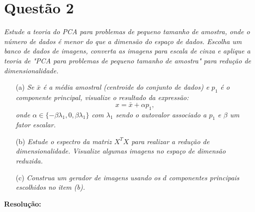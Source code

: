 \documentclass[a4paper, 11pt]{article}
\begin{document}

\section{\textbf{Questão 2}}
\noindent \textit{Estude a teoria do PCA para problemas de pequeno tamanho de amostra, onde o número de dados é menor do que a dimensão do espaço de dados. Escolha um banco de dados de imagens, converta as imagens para escala de cinza e aplique a teoria de "PCA para problemas de pequeno tamanho de amostra" para redução de dimensionalidade.}

\begin{enumerate}
    \item[(a)] \textit{Se $\bar{x}$ é a média amostral (centroide do conjunto de dados) e $p_1$ é o componente principal, visualize o resultado da expressão:}
    \[
    x = \bar{x} + \alpha p_1,
    \]
    \textit{onde $\alpha \in \{-\beta \lambda_1, 0, \beta \lambda_1\}$ com $\lambda_1$ sendo o autovalor associado a $p_1$ e $\beta$ um fator escalar.}
    
    \item[(b)] \textit{Estude o espectro da matriz $X^T X$ para realizar a redução de dimensionalidade. Visualize algumas imagens no espaço de dimensão reduzida.}
    
    \item[(c)] \textit{Construa um gerador de imagens usando os $d$ componentes principais escolhidos no item (b).}
\end{enumerate}

\textbf{Resolução:}
\end{document}

